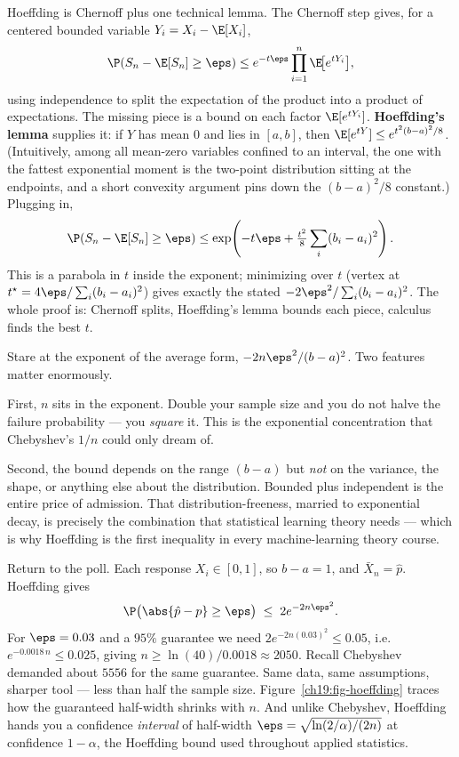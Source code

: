 \begin{whybox}
Hoeffding is Chernoff plus one technical lemma. The Chernoff step gives, for a
centered bounded variable $Y_i = X_i - \E[X_i]$,
\[
  \P(S_n - \E[S_n] \ge \eps)
  \le e^{-t\eps}\prod_{i=1}^n \E\!\bigl[e^{tY_i}\bigr],
\]
using independence to split the expectation of the product into a product of
expectations. The missing piece is a bound on each factor $\E[e^{tY_i}]$.
\textbf{Hoeffding's lemma} supplies it: if $Y$ has mean $0$ and lies in
$[a,b]$, then $\E[e^{tY}] \le e^{t^2(b-a)^2/8}$. (Intuitively, among all
mean-zero variables confined to an interval, the one with the fattest
exponential moment is the two-point distribution sitting at the endpoints,
and a short convexity argument pins down the $(b-a)^2/8$ constant.) Plugging
in,
\[
  \P(S_n - \E[S_n] \ge \eps)
  \le \exp\!\left(-t\eps + \tfrac{t^2}{8}\sum_i (b_i-a_i)^2\right).
\]
This is a parabola in $t$ inside the exponent; minimizing over $t$ (vertex at
$t^\star = 4\eps/\sum_i (b_i-a_i)^2$) gives exactly the stated
$-2\eps^2/\sum_i(b_i-a_i)^2$. The whole proof is: Chernoff splits, Hoeffding's
lemma bounds each piece, calculus finds the best $t$.
\end{whybox}

\begin{happeningbox}
Stare at the exponent of the average form, $-2n\eps^2/(b-a)^2$. Two features
matter enormously.

First, $n$ sits in the exponent. Double your sample size and you do not halve
the failure probability --- you \emph{square} it. This is the exponential
concentration that Chebyshev's $1/n$ could only dream of.

Second, the bound depends on the range $(b-a)$ but \emph{not} on the variance,
the shape, or anything else about the distribution. Bounded plus independent is
the entire price of admission. That distribution-freeness, married to
exponential decay, is precisely the combination that statistical learning
theory needs --- which is why Hoeffding is the first inequality in every
machine-learning theory course.
\end{happeningbox}

\begin{example}
\label{ch19:ex-poll-sharp}
Return to the poll. Each response $X_i \in [0,1]$, so $b-a = 1$, and
$\bar X_n = \hat p$. Hoeffding gives
\[
  \P\bigl(\abs{\hat p - p} \ge \eps\bigr)
  \;\le\; 2 e^{-2n\eps^2}.
\]
For $\eps = 0.03$ and a $95\%$ guarantee we need $2e^{-2n(0.03)^2} \le 0.05$,
i.e.\ $e^{-0.0018\,n} \le 0.025$, giving
$n \ge \ln(40)/0.0018 \approx 2050$. Recall Chebyshev demanded about
$5556$ for the same guarantee. Same data, same assumptions, sharper tool ---
less than half the sample size. Figure~\ref{ch19:fig-hoeffding} traces how the
guaranteed half-width shrinks with $n$. And unlike Chebyshev, Hoeffding hands you a
confidence \emph{interval} of half-width $\eps = \sqrt{\ln(2/\alpha)/(2n)}$ at
confidence $1-\alpha$, the Hoeffding bound used throughout applied statistics.
\end{example}

